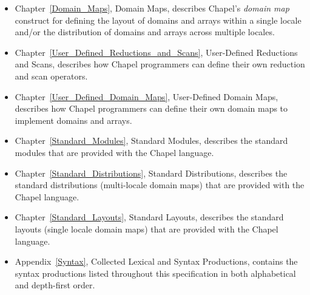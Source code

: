 \begin{itemize}
\item
Chapter~\ref{Domain_Maps}, Domain Maps, describes
Chapel's \emph{domain map} construct for defining the layout of
domains and arrays within a single locale and/or the distribution of
domains and arrays across multiple locales.

\item
Chapter~\ref{User_Defined_Reductions_and_Scans}, User-Defined
Reductions and Scans, describes how Chapel programmers can define
their own reduction and scan operators.

\item
Chapter~\ref{User_Defined_Domain_Maps}, User-Defined Domain Maps,
describes how Chapel programmers can define their own domain maps to
implement domains and arrays.

\item
Chapter~\ref{Standard_Modules}, Standard Modules, describes the
standard modules that are provided with the Chapel language.

\item
Chapter~\ref{Standard_Distributions}, Standard Distributions,
describes the standard distributions (multi-locale domain maps) that
are provided with the Chapel language.

\item
Chapter~\ref{Standard_Layouts}, Standard Layouts, describes the
standard layouts (single locale domain maps) that are provided with
the Chapel language.

\item
Appendix~\ref{Syntax}, Collected Lexical and Syntax Productions,
contains the syntax productions listed throughout this specification
in both alphabetical and depth-first order.

\end{itemize}
